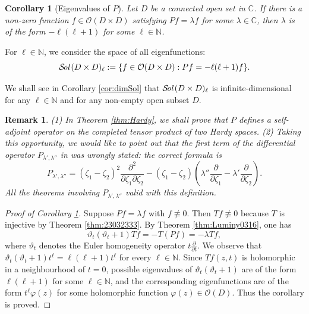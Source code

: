 \documentclass[12pt,leqno]{amsart}
\theoremstyle{plain}
\newtheorem{corollary}[thm]{Corollary}
\newtheorem{remark}[thm]{Remark}
\theoremstyle{definition}
\newcommand\Sol{{\mathcal {S}}\!{\text{\it{ol}}}\,}
\begin{document}
\begin{corollary}
[Eigenvalues of $P$]
\label{cor:Peigen}
Let $D$ be a connected open set in ${\mathbb{C}}$.  
If there is a non-zero function $f \in {\mathcal{O}}(D \times D)$
 satisfying $P f = \lambda f$ for some $\lambda \in {\mathbb{C}}$, 
then $\lambda$ is of the form $-\ell (\ell+1)$
 for some $\ell \in {\mathbb{N}}$.  
\end{corollary}



For $\ell \in {\mathbb{N}}$, 
 we consider the space of all eigenfunctions:
\begin{equation}
\label{eqn:Sol}
  \Sol(D \times D)_{\ell}
  :=
  \{f \in {\mathcal{O}}(D \times D):
   P f = -\ell(\ell+1)f \}.  
\end{equation}



We shall see in Corollary \ref{cor:dimSol}
 that $\Sol(D \times D)_{\ell}$ is infinite-dimensional 
 for any $\ell \in {\mathbb{N}}$
 and for any non-empty open subset $D$.  

\begin{remark}
{\rm{(1)}}\enspace
In Theorem \ref{thm:Hardy}, 
 we shall prove that 
$P$ defines a self-adjoint operator 
 on the completed tensor product of two Hardy spaces.  
\newline
{\rm{(2)}}\enspace
Taking this opportunity, 
 we would like to point out
 that the first term
 of the differential operator
 $P_{\lambda', \lambda''}$
 in \cite[(2.31)]{KP20}
 was wrongly stated:
the correct formula is 
\[
P_{\lambda', \lambda''}
=
(\zeta_1-\zeta_2)^2 \frac{\partial^2}{\partial \zeta_1 \partial \zeta_2}
-
(\zeta_1-\zeta_2)
(\lambda'' \frac{\partial}{\partial \zeta_1}
-\lambda' \frac{\partial}{\partial \zeta_2}). 
\]
All the theorems
 involving $P_{\lambda', \lambda''}$ valid with this definition.  
\end{remark}



\begin{proof}
[Proof of Corollary \ref{cor:Peigen}]
Suppose $P f=\lambda f$ with $f \not \equiv 0$.  
Then $T f \not \equiv 0$
 because $T$ is injective 
 by Theorem \ref{thm:23032333}.  
By Theorem \ref{thm:Luminy0316}, 
 one has 
\[
  \vartheta_t (\vartheta_t+1) T f
  =
  -T(P f)
  =
  -\lambda T f, 
\]
where $\vartheta_t$ denotes the Euler homogeneity operator
 $t \frac{\partial}{\partial t}$.  
We observe 
 that $\vartheta_t (\vartheta_t +1)t^{\ell} = \ell(\ell+1) t^{\ell}$
 for every $\ell \in{\mathbb{N}}$.  
Since $T f(z, t)$ is holomorphic in a neighbourhood of $t=0$, 
 possible eigenvalues
 of $\vartheta_t(\vartheta_t+1)$ are of the form 
 $\ell(\ell+1)$ for some $\ell \in {\mathbb{N}}$, 
 and the corresponding eigenfunctions are of the form
 $t^{\ell}\varphi(z)$ 
for some holomorphic function $\varphi(z) \in {\mathcal{O}}(D)$.  
Thus the corollary is proved.  
\end{proof}
\end{document}
